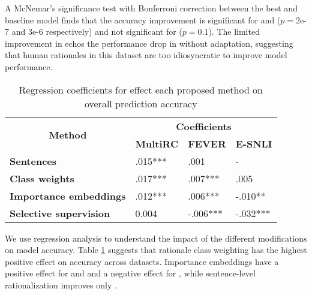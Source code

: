 A McNemar's significance test with 
Bonferroni correction between the best and baseline model finds that the accuracy improvement is significant for \multirc and \fever ($p=$2e-7 and 3e-6 respectively) and not significant for \esnli ($p=0.1$). 
The limited improvement in \esnli echos the performance drop in  without adaptation, suggesting that human rationales in this dataset are too idiosyncratic to improve model performance.




\begin{table}[]
\small
\centering
\begin{tabular}{@{}llll@{}}
\toprule
\multicolumn{1}{c}{\multirow{2}{*}{\textbf{Method}}}             & \multicolumn{3}{c}{\textbf{Coefficients}}                                                   \\ \cmidrule(l){2-4} 
\multicolumn{1}{c}{}                                             & \multicolumn{1}{c}{\textbf{MultiRC}} & \multicolumn{1}{c}{\textbf{FEVER}} & \textbf{E-SNLI} \\ \midrule
\textbf{Sentences}                                                        & .015***                              & .001                               & -               \\
\textbf{Class weights}                                                    & .017***                              & .007***                            & .005            \\
\textbf{Importance embeddings}                                                       & .012***                              & .006***                            & -.010**         \\
\textbf{Selective supervision} & 0.004                                & -.006***                           & -.032***        \\ \bottomrule
\end{tabular}
\caption{Regression coefficients for effect each proposed method on overall prediction accuracy}
\label{tab:regression_table}
\end{table}

We use regression analysis to understand the impact of the different modifications on model accuracy.
Table \ref{tab:regression_table} suggests that rationale class weighting has the highest positive effect on accuracy across datasets. Importance embeddings have a positive effect for \multirc and \fever and a negative effect for \esnli, while sentence-level rationalization improves only \multirc. 

